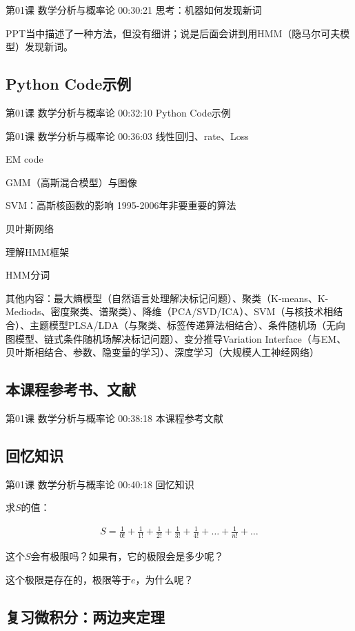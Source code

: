 \documentclass[UTF8]{ctexbook}
\begin{document}
第01课 数学分析与概率论 00:30:21 思考：机器如何发现新词

PPT当中描述了一种方法，但没有细讲；说是后面会讲到用HMM（隐马尔可夫模型）发现新词。

\subsection{Python Code示例}

第01课 数学分析与概率论 00:32:10 Python Code示例

第01课 数学分析与概率论 00:36:03 线性回归、rate、Loss

EM code

GMM（高斯混合模型）与图像

SVM：高斯核函数的影响        1995-2006年非要重要的算法

贝叶斯网络

理解HMM框架

HMM分词

其他内容：最大熵模型（自然语言处理解决标记问题）、聚类（K-means、K-Mediods、密度聚类、谱聚类）、降维（PCA/SVD/ICA）、SVM（与核技术相结合）、主题模型PLSA/LDA（与聚类、标签传递算法相结合）、条件随机场（无向图模型、链式条件随机场解决标记问题）、变分推导Variation Interface（与EM、贝叶斯相结合、参数、隐变量的学习）、深度学习（大规模人工神经网络）

\subsection{本课程参考书、文献}

第01课 数学分析与概率论 00:38:18 本课程参考文献

\subsection{回忆知识}

第01课 数学分析与概率论 00:40:18 回忆知识

求$S$的值：

\begin{equation}
\begin{aligned}
S=\frac{1}{0!}+\frac{1}{1!}+\frac{1}{2!}+\frac{1}{3!}+\frac{1}{4!}+\dots+\frac{1}{n!}+\dots
\end{aligned}
\end{equation}

这个$S$会有极限吗？如果有，它的极限会是多少呢？

这个极限是存在的，极限等于$e$，为什么呢？

\subsection{复习微积分：两边夹定理}
\end{document}
